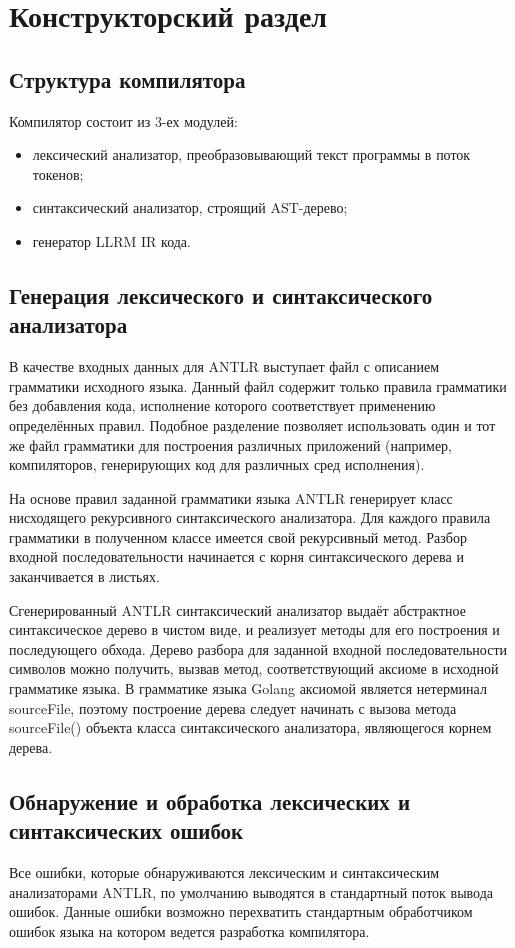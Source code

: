 \section{Конструкторский раздел}\label{sec:construct}

\subsection{Структура компилятора}\label{subsec:structure}
Компилятор состоит из 3-ех модулей:
\begin{itemize}
    \item лексический анализатор, преобразовывающий текст программы в поток токенов;
    \item синтаксический анализатор, строящий AST-дерево;
    \item генератор LLRM IR кода.
\end{itemize}

\subsection{Генерация лексического и синтаксического анализатора}\label{subsec:lex_synt_gen}
В качестве входных данных для ANTLR выступает файл с описанием грамматики исходного языка.
Данный файл содержит только правила грамматики без добавления кода, исполнение которого соответствует
применению определённых правил.
Подобное разделение позволяет использовать один и тот же файл грамматики для построения различных приложений
(например, компиляторов, генерирующих код для различных сред исполнения).

На основе правил заданной грамматики языка ANTLR генерирует класс нисходящего рекурсивного синтаксического анализатора.
Для каждого правила грамматики в полученном классе имеется свой рекурсивный метод.
Разбор входной последовательности начинается с корня синтаксического дерева и заканчивается в листьях.

Сгенерированный ANTLR синтаксический анализатор выдаёт абстрактное синтаксическое дерево в чистом виде, и реализует методы для
его построения и последующего обхода.
Дерево разбора для заданной входной последовательности символов можно получить, вызвав метод, соответствующий аксиоме
в исходной грамматике языка.
В грамматике языка Golang аксиомой является нетерминал sourceFile, поэтому построение дерева следует начинать с вызова
метода sourceFile() объекта класса синтаксического анализатора, являющегося корнем дерева.

\subsection{Обнаружение и обработка лексических и синтаксических ошибок}\label{subsec:errors}
Все ошибки, которые обнаруживаются лексическим и синтаксическим анализаторами ANTLR, по умолчанию выводятся в стандартный поток вывода ошибок.
Данные ошибки возможно перехватить стандартным обработчиком ошибок языка на котором ведется разработка компилятора.

